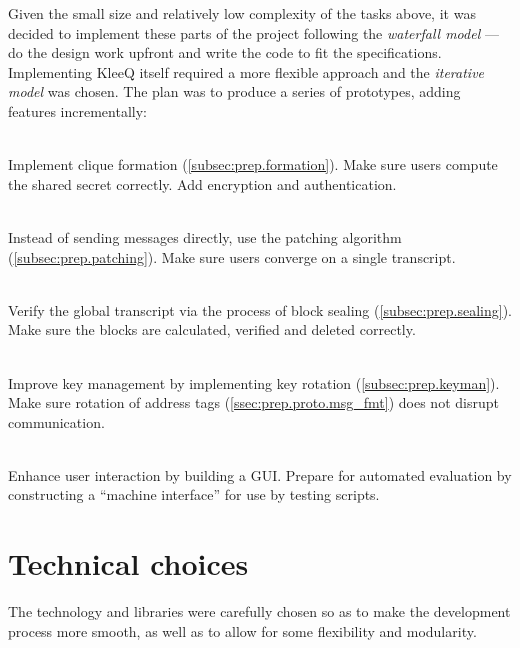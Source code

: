 \documentclass[a4paper, 12pt]{report}
\begin{document}
Given the small size and relatively low complexity of the tasks above, it was decided to implement these parts of the project following the \emph{waterfall model} --- do the design work upfront and write the code to fit the specifications. \\

Implementing KleeQ itself required a more flexible approach and the \emph{iterative model} was chosen. The plan was to produce a series of prototypes, adding features incrementally:
\begin{description}[labelindent=0.5cm, leftmargin=1.3cm, rightmargin=0.5cm]
    \item[Prototype 1: Clique Formation]\hfill \\
        Implement clique formation (\cref{subsec:prep.formation}). Make sure users compute the shared secret correctly. Add encryption and authentication.
    \item[Prototype 2: Patching]\hfill \\
        Instead of sending messages directly, use the patching algorithm (\cref{subsec:prep.patching}). Make sure users converge on a single transcript.
    \item[Prototype 3: Sealing]\hfill \\
        Verify the global transcript via the process of block sealing (\cref{subsec:prep.sealing}). Make sure the blocks are calculated, verified and deleted correctly.
    \item[Prototype 4: Key Management]\hfill \\
        Improve key management by implementing key rotation (\cref{subsec:prep.keyman}). Make sure rotation of address tags (\cref{ssec:prep.proto.msg_fmt}) does not disrupt communication.
    \item[Prototype 5: Interface] \hfill \\
        Enhance user interaction by building a GUI. Prepare for automated evaluation by constructing a ``machine interface'' for use by testing scripts. 
\end{description}

\section{Technical choices}
\label{sec:choices}
The technology and libraries were carefully chosen so as to make the development process more smooth, as well as to allow for some flexibility and modularity.
\end{document}
